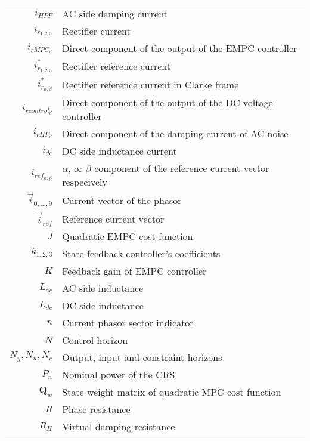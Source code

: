 \begin{longtable}{r l}
  $i_{HPF}$                         & AC side damping current\\
  $i_{r_{1,2,3}}$                   & Rectifier current\\
  $i_{rMPC_d}$                      & Direct component of the output of the EMPC controller\\
  $i^*_{r_{1,2,3}}$                 & Rectifier reference current\\
  $i^*_{r_{\alpha,\beta}}$          & Rectifier reference current in Clarke frame\\
  $i_{rcontrol_d}$                  & Direct component of the output of the DC voltage controller\\
  $i_{rHF_d}$                       & Direct component of the damping current of AC noise\\
  $i_{dc}$                          & DC side inductance current\\
  $i_{ref_{\alpha,\beta}}$          & $\alpha$, or $\beta$ component of the reference current vector respecively\\
  $\vec{i}_{0,\dots,9}$             & Current vector of the phasor\\
  $\vec{i}_{ref}$                   & Reference current vector\\
  $J$                               & Quadratic EMPC cost function\\
  $k_{1,2,3}$                       & State feedback controller's coefficients\\
  $K$                               & Feedback gain of EMPC controller\\
  $L_{ac}$                          & AC side inductance\\
  $L_{dc}$                          & DC side inductance\\
  $n$                               & Current phasor sector indicator\\
  $N$                               & Control horizon\\
  $N_y,N_u,N_c$                     & Output, input and constraint horizons\\
  $P_n$                             & Nominal power of the CRS\\
  $\boldsymbol{Q}_w$                & State weight matrix of quadratic MPC cost function\\
  $R$                               & Phase resistance\\
  $R_H$                             & Virtual damping resistance\\

\end{longtable}
